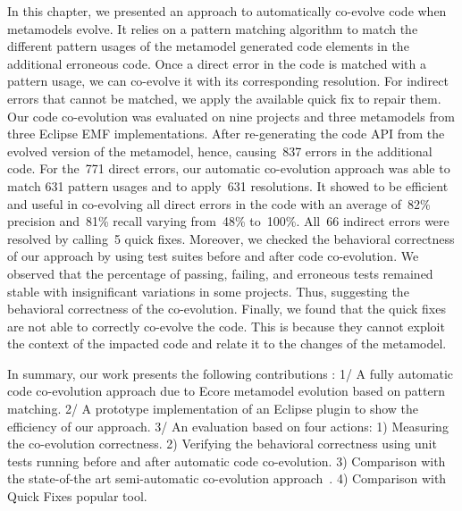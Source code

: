 In this chapter, we presented an approach to automatically co-evolve code when metamodels evolve. It relies on a pattern matching algorithm to match the different pattern usages of the metamodel generated code elements in the additional erroneous code. Once a direct error in the code is matched with a pattern usage, we can co-evolve it with its corresponding resolution. 
For indirect errors that cannot be matched, we apply the available quick fix to repair them. 
%
Our code co-evolution was evaluated on nine projects and three metamodels from three Eclipse EMF implementations. After re-generating the code API from the evolved version of the metamodel, hence, causing~837 errors in the additional code.
For the~771 direct errors, our automatic co-evolution approach was able to match 631 pattern usages and to apply~631 resolutions. It showed to be efficient and useful in co-evolving all direct errors in the code with an average of~82\% precision and~81\% recall varying from~48\% to~100\%. All~66 indirect errors were resolved by calling~5 quick fixes. Moreover, we checked the behavioral correctness of our approach by using test suites before and after code co-evolution. We observed that the percentage of passing, failing, and erroneous tests remained stable with insignificant variations in some projects. Thus, suggesting the behavioral correctness of the co-evolution. Finally, we found that the quick fixes are not able to correctly co-evolve the code. This is because they cannot exploit the context of the impacted code and relate it to the changes of the metamodel. 


In summary, our work presents the following contributions :
1/ A fully automatic code co-evolution approach due to Ecore metamodel evolution based on pattern matching. 
2/ A prototype implementation of an Eclipse plugin to show the efficiency of our approach. %
3/ An evaluation based on four actions: 1) Measuring the co-evolution correctness. 2) Verifying the behavioral correctness using unit tests running before and after automatic code co-evolution. 3) Comparison with the state-of-the art semi-automatic co-evolution approach~\cite{Khelladi2020}. 4) Comparison with Quick Fixes popular tool.



